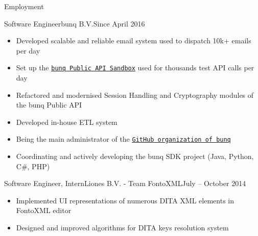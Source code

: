 \documentclass[calibri]{mcdowellcv}
\newcommand{\ultthref}[2]{\href{#1}{\underline{\texttt{#2}}}}
\begin{document}
	\makeheader
	
	\begin{cvsection}{Employment}
		\begin{cvsubsection}{Software Engineer}{bunq B.V.}{Since April 2016}			
			\begin{itemize}
				\item Developed scalable and reliable email system used to dispatch 10k+ emails per day
				\item Set up the \ultthref{https://doc.bunq.com}{bunq Public API Sandbox} used for thousands test API calls per day
				\item Refactored and modernised Session Handling and Cryptography modules of the bunq Public API
				\item Developed in-house ETL system
				\item Being the main administrator of the \ultthref{https://github.com/bunq}{GitHub organization of bunq} 
				\item Coordinating and actively developing the bunq SDK project (Java, Python, C\#, PHP)
			\end{itemize}
		\end{cvsubsection}
		\begin{cvsubsection}{Software Engineer, Intern}{Liones B.V. - Team FontoXML}{July -- October 2014}
			\begin{itemize}
				\item Implemented UI representations of numerous DITA XML elements in FontoXML editor
				\item Designed and improved algorithms for DITA keys resolution system
			\end{itemize}
		\end{cvsubsection}
	\end{cvsection}
\end{document}
